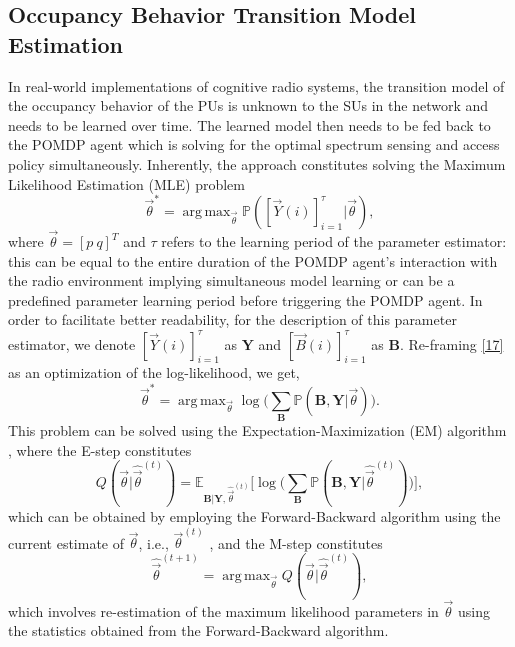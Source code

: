 \documentclass[10pt,twocolumn]{IEEEtran}
\DeclareMathOperator*{\argmax}{arg\,max}
\begin{document}
\subsection{Occupancy Behavior Transition Model Estimation}
In real-world implementations of cognitive radio systems, the transition model of the occupancy behavior of the PUs is unknown to the SUs in the network and needs to be learned over time. The learned model then needs to be fed back to the POMDP agent which is solving for the optimal spectrum sensing and access policy simultaneously. Inherently, the approach constitutes solving the Maximum Likelihood Estimation (MLE) problem
\begin{equation}\label{17}
    \vec{\theta}^{*} = \argmax_{\vec{\theta}} \mathbb{P}([\vec{Y}(i)]_{i=1}^{\tau}|\vec{\theta}),
\end{equation}
where $\vec{\theta}{=}[p\ q]^{T}$ and $\tau$ refers to the learning period of the parameter estimator: this can be equal to the entire duration of the POMDP agent's interaction with the radio environment implying simultaneous model learning or can be a predefined parameter learning period before triggering the POMDP agent. In order to facilitate better readability, for the description of this parameter estimator, we denote $[\vec{Y}(i)]_{i=1}^{\tau}$ as $\mathbf{Y}$ and $[\vec{B}(i)]_{i=1}^{\tau}$ as $\mathbf{B}$. Re-framing \eqref{17} as an optimization of the log-likelihood, we get,
\begin{equation}\label{18}
    \vec{\theta}^{*} = \argmax_{\vec{\theta}} \log\Big(\sum_{\mathbf{B}} \mathbb{P}(\mathbf{B}, \mathbf{Y}| \vec{\theta})\Big).
\end{equation}
This problem can be solved using the Expectation-Maximization (EM) algorithm \cite{778361}, where the E-step constitutes
\begin{equation}
    Q(\vec{\theta}|\hat{\vec{\theta}}^{(t)}) = \mathbb{E}_{\mathbf{B}|\mathbf{Y}, \hat{\vec{\theta}}^{(t)}} \Big[ \log \Big(\sum_{\mathbf{B}} \mathbb{P}(\mathbf{B}, \mathbf{Y}|\hat{\vec{\theta}}^{(t)}) \Big) \Big],
\end{equation}
which can be obtained by employing the Forward-Backward algorithm using the current estimate of $\vec{\theta}$, i.e., $\vec{\theta}^{(t)}$ \cite{778361}, and the M-step constitutes
\begin{equation}
    \hat{\vec{\theta}}^{(t+1)} = \argmax_{\vec{\theta}} Q(\vec{\theta}|\hat{\vec{\theta}}^{(t)}),
\end{equation}
which involves re-estimation of the maximum likelihood parameters in $\vec{\theta}$ using the statistics obtained from the Forward-Backward algorithm.
\vspace{-2mm}
\end{document}

